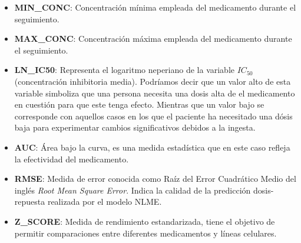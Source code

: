 \begin{enumerate}
\begin{itemize}
        \item \textbf{MIN\_CONC}: Concentración mínima empleada del medicamento durante el seguimiento.
        \item \textbf{MAX\_CONC}: Concentración máxima empleada del medicamento durante el seguimiento.
        \item \textbf{LN\_IC50}: Representa el logaritmo neperiano de la variable $IC_{50}$ (concentración inhibitoria media). Podríamos decir que un valor alto de esta variable simboliza que una persona necesita una dosis alta de el medicamento en cuestión para que este tenga efecto. Mientras que un valor bajo se corresponde con aquellos casos en los que el paciente ha necesitado una dósis baja para experimentar cambios significativos debidos a la ingesta.
        \item \textbf{AUC}: Área bajo la curva, es una medida estadística que en este caso refleja la efectividad del medicamento.
        \item \textbf{RMSE}: Medida de error conocida como Raíz del Error Cuadrático Medio del inglés \textit{Root Mean Square Error}. Indica la calidad de la predicción dosis-repuesta realizada por el modelo NLME.
        \item \textbf{Z\_SCORE}: Medida de rendimiento estandarizada, tiene el objetivo de permitir comparaciones entre diferentes medicamentos y líneas celulares.
      \end{itemize}


\end{enumerate}
